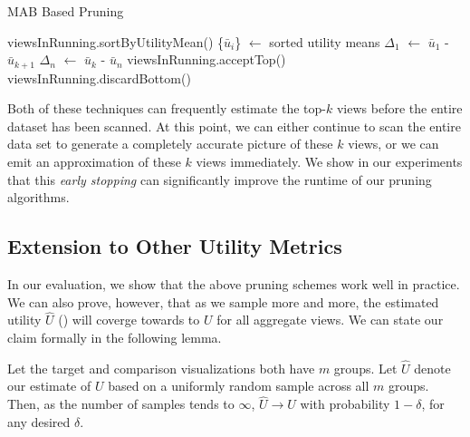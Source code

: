\begin{algorithm}
\caption{MAB Based Pruning}
\label{algo:mab_based_pruning}
\begin{algorithmic}[1]
\State viewsInRunning.sortByUtilityMean()
\State \{$\bar{u}_{i}$\} $\gets$ sorted utility means
\State $\Delta_1$ $\gets$ $\bar{u}_{1}$ - $\bar{u}_{k+1}$
\State $\Delta_n$ $\gets$ $\bar{u}_{k}$ - $\bar{u}_{n}$
\State viewsInRunning.acceptTop()
\Else
\State viewsInRunning.discardBottom()
\EndIf
\end{algorithmic}
\end{algorithm}


Both of these techniques can frequently estimate the top-$k$ views before the entire dataset has been scanned.
At this point, we can either continue to scan the entire data set to generate a completely accurate
picture of these $k$ views, or we can emit an approximation of these $k$ views immediately.  We show 
in our experiments that this {\it early stopping} can significantly improve the runtime of our pruning algorithms.

\subsection{Extension to Other Utility Metrics}



In our evaluation, we show that the above  pruning schemes
work  well in practice. 
We can also prove, however,  that as we sample more and more, the estimated utility
$\hat{U}$ () will coverge towards to $U$ for all aggregate views.
We can state our claim formally in the following lemma. 

\begin{lemma}
Let the target and comparison visualizations
both have $m$ groups.
Let $\hat{U}$ denote our estimate of $U$ based on a uniformly random sample 
across all $m$ groups. 
Then, as the number of samples tends to $\infty$, $\hat{U} \rightarrow U$
with probability $1-\delta$, for any desired $\delta$.
\end{lemma}